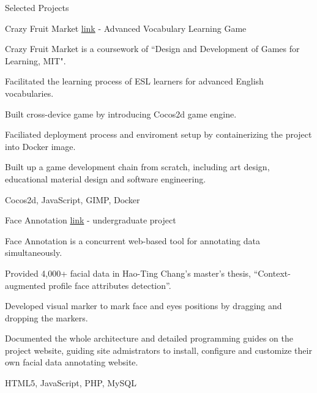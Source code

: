 \documentclass{cv}
\begin{document}
\pagebreak


\begin{cvSection}{Selected Projects}

\begin{projectSubsection}{Crazy Fruit Market  \href{http://jasson15.github.io/crazy-fruit-market}{link}}{ - }{Advanced Vocabulary Learning Game}

\item Crazy Fruit Market is a coursework of ``Design and Development of Games for Learning, MIT".
\item Facilitated the learning process of ESL learners for advanced English vocabularies.
\item Built cross-device game by introducing Cocos2d game engine.
\item Faciliated deployment process and enviroment setup by containerizing the project into Docker image.
\item Built up a game development chain from scratch, including art design, educational material design and software engineering.
\item Cocos2d, JavaScript, GIMP, Docker

\end{projectSubsection}

\begin{projectSubsection}{Face Annotation \href{http://cmlab.csie.ntu.edu.tw/~pi/face_annotation}{link}}{ - }{undergraduate project}

\item Face Annotation is a concurrent web-based tool for annotating data simultaneously.
\item Provided 4,000+ facial data in Hao-Ting Chang's master's thesis, “Context-augmented profile face attributes detection”.
\item Developed visual marker to mark face and eyes positions by dragging and dropping the markers. 
\item Documented the whole architecture and detailed programming guides on the project website, guiding site admistrators to install, configure and customize their own facial data annotating website. 
\item HTML5, JavaScript, PHP, MySQL


\end{projectSubsection}
\end{cvSection}
\end{document}
